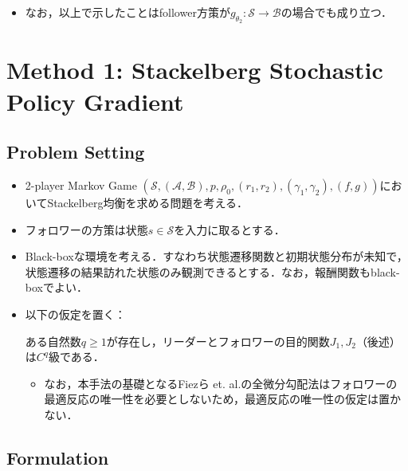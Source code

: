 \documentclass[a4paper,10pt,dvipdfmx]{jsarticle}
\begin{document}
\begin{itemize}
\begin{lemma}
\begin{align}
\begin{multlined}
            =\E_{d_{\gamma_i}^{\theta}}^{f_{\theta_1}g_{\theta_2}}[h(\dot{s},\dot{a},\dot{b})|s,a,b]-(1-\gamma_i)h(s,a,b).
        \end{multlined}\label{eq:rewrite_exp_ocup_c}
    \end{align}
    \end{lemma}
    \begin{proof}
        See .
    \end{proof}

    \item なお，以上で示したことはfollower方策が$g_{\theta_2}:\mathcal{S}\to\mathcal{B}$の場合でも成り立つ．
\end{itemize}


\section{Method 1: Stackelberg Stochastic Policy Gradient}\label{sec:ST-SPG}

\subsection{Problem Setting}

\begin{itemize}
    \item 2-player Markov Game $(\mathcal{S}, (\mathcal{A},\mathcal{B}), p, \rho_0, (r_1,r_2), (\gamma_1,\gamma_2),(f,g))$においてStackelberg均衡を求める問題を考える．
    \item フォロワーの方策は状態$s\in\mathcal{S}$を入力に取るとする．
    \item Black-boxな環境を考える．すなわち状態遷移関数と初期状態分布が未知で，状態遷移の結果訪れた状態のみ観測できるとする．なお，報酬関数もblack-boxでよい．
    \item 以下の仮定を置く：
    \begin{assumption}\label{thrm:Cq_assumption}
        ある自然数$q\ge 1$が存在し，リーダーとフォロワーの目的関数$J_1, J_2$（後述）は$C^q$級である．
    \end{assumption}
    \begin{itemize}
        \item なお，本手法の基礎となるFiezら et. al.\cite{Fiez2020-lu}の全微分勾配法はフォロワーの最適反応の唯一性を必要としないため，最適反応の唯一性の仮定は置かない．
    \end{itemize}
\end{itemize}

\subsection{Formulation}
\end{document}
